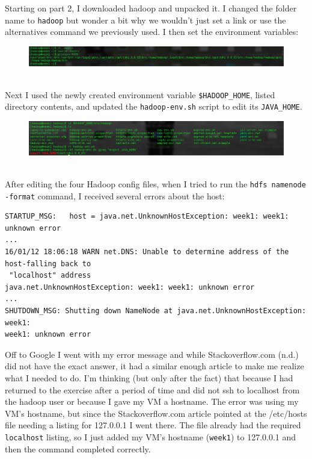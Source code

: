 \documentclass[10pt]{article}
\begin{document}
Starting on part 2, I downloaded hadoop and unpacked it. I changed the folder name to \verb|hadoop| but wonder a bit why we wouldn't just set a link or use the alternatives command we previously used. I then set the environment variables:
\begin{figure}[!h]
\includegraphics[scale=0.37]{hadoop_path.png}
\centering
\end{figure}\\
Next I used the newly created environment variable \verb|$HADOOP_HOME|, listed directory contents, and updated the \verb|hadoop-env.sh| script to edit its \verb|JAVA_HOME|.
\begin{figure}[!h]
\includegraphics[scale=0.37]{java_home.png}
\centering
\end{figure}\\
After editing the four Hadoop config files, when I tried to run the \verb|hdfs namenode -format| command, I received several errors about the host:
\begin{verbatim}
STARTUP_MSG:   host = java.net.UnknownHostException: week1: week1: unknown error
...
16/01/12 18:06:18 WARN net.DNS: Unable to determine address of the host-falling back to
 "localhost" address
java.net.UnknownHostException: week1: week1: unknown error
...
SHUTDOWN_MSG: Shutting down NameNode at java.net.UnknownHostException: week1: 
week1: unknown error
\end{verbatim}
Off to Google I went with my error message and while Stackoverflow.com (n.d.) did not have the exact answer, it had a similar enough article to make me realize what I needed to do. I'm thinking (but only after the fact) that because I had returned to the exercise after a period of time and did not ssh to localhost from the hadoop user or because I gave my VM a hostname. The error was using my VM's hostname, but since the Stackoverflow.com article pointed at the /etc/hosts file needing a listing for 127.0.0.1 I went there. The file already had the required \verb|localhost| listing, so I just added my VM's hostname (\verb|week1|) to 127.0.0.1 and then the command completed correctly.
\par
{}%
\end{document}

